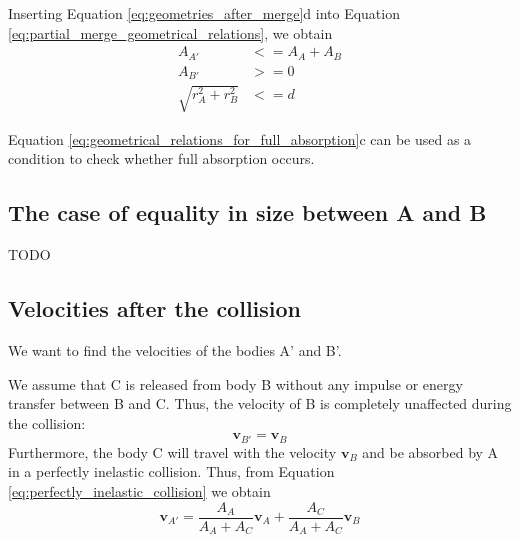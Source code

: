 \documentclass{article}
\newcommand{\vbs}[0]{\boldsymbol{v}}
\begin{document}
Inserting Equation \ref{eq:geometries_after_merge}d into Equation \ref{eq:partial_merge_geometrical_relations}, we obtain
\begin{equation}
\label{eq:geometrical_relations_for_full_absorption}
\begin{split}
A_{A'} &<= A_A + A_B\\
A_{B'} &>= 0\\
\sqrt{r_A^2 + r_B^2} &<= d
\end{split}
\end{equation}

Equation \ref{eq:geometrical_relations_for_full_absorption}c can be used as a condition to check whether full absorption occurs.

\subsection{The case of equality in size between A and B}
TODO



\subsection{Velocities after the collision}
We want to find the velocities of the bodies A' and B'.

We assume that C is released from body B without any impulse or energy transfer between B and C. Thus, the velocity of B is completely unaffected during the collision:
\begin{equation}
\vbs_{B'} = \vbs_B
\end{equation}
Furthermore, the body C will travel with the velocity $\vbs_B$ and be absorbed by A in a perfectly inelastic collision. Thus, from Equation \ref{eq:perfectly_inelastic_collision} we obtain
\begin{equation}
\vbs_{A'} = \frac{A_A}{A_A + A_C}\vbs_A + \frac{A_C}{A_A + A_C}\vbs_B
\end{equation}
\end{document}
